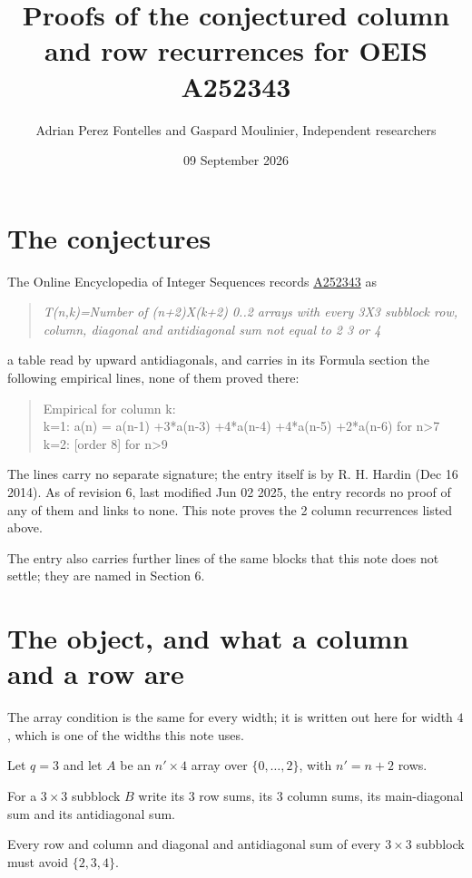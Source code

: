 \documentclass[11pt]{article}
\title{Proofs of the conjectured column and row recurrences for OEIS A252343}
\author{Adrian Perez Fontelles and Gaspard Moulinier, Independent researchers}
\date{09 September 2026}
\theoremstyle{definition}
\begin{document}
\maketitle
\section{The conjectures}

The Online Encyclopedia of Integer Sequences records \href{https://oeis.org/A252343}{A252343} as

\begin{quote}\itshape T(n,k)=Number of (n+2)X(k+2) 0..2 arrays with every 3X3 subblock row, column, diagonal and antidiagonal sum not equal to 2 3 or 4\end{quote}

a table read by upward antidiagonals, and carries in its Formula section the following empirical lines, none of them proved there:

\begin{quote}\ttfamily Empirical for column k:\\
k=1: a(n) = a(n-1) +3*a(n-3) +4*a(n-4) +4*a(n-5) +2*a(n-6) for n>7\\k=2: [order 8] for n>9\end{quote}

The lines carry no separate signature; the entry itself is by R. H. Hardin (Dec 16 2014). As of revision 6, last modified Jun 02 2025, the entry records no proof of any of them and links to none. This note proves the 2 column recurrences listed above.

The entry also carries further lines of the same blocks that this note does not settle; they are named in Section 6.

\section{The object, and what a column and a row are}

The array condition is the same for every width; it is written out here for width $4$, which is one of the widths this note uses.

Let $q = 3$ and let $A$ be an $n' \times 4$ array over $\{0,\dots,2\}$, with $n' = n + 2$ rows.

For a $3\times3$ subblock $B$ write its 3 row sums, its 3 column sums, its main-diagonal sum and its antidiagonal sum.

Every row and column and diagonal and antidiagonal sum of every $3\times3$ subblock must avoid $\{2, 3, 4\}$.
\end{document}
